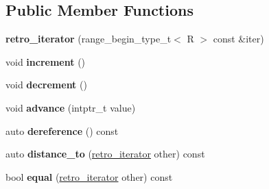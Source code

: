 \subsection*{Public Member Functions}
\begin{DoxyCompactItemize}
\item 
\mbox{\label{struct_r_a_h___n_a_m_e_s_p_a_c_e_1_1view_1_1retro__iterator_adb9205eb961750d70b557e4feb097e90}} 
{\bfseries retro\+\_\+iterator} (range\+\_\+begin\+\_\+type\+\_\+t$<$ R $>$ const \&iter)
\item 
\mbox{\label{struct_r_a_h___n_a_m_e_s_p_a_c_e_1_1view_1_1retro__iterator_a9eb8615dcaec398cc57595dcb7822af2}} 
void {\bfseries increment} ()
\item 
\mbox{\label{struct_r_a_h___n_a_m_e_s_p_a_c_e_1_1view_1_1retro__iterator_acc9b3287cf662c34313077a70594ad95}} 
void {\bfseries decrement} ()
\item 
\mbox{\label{struct_r_a_h___n_a_m_e_s_p_a_c_e_1_1view_1_1retro__iterator_abcb1e1453c7577e8a79ebad3f81ead98}} 
void {\bfseries advance} (intptr\+\_\+t value)
\item 
\mbox{\label{struct_r_a_h___n_a_m_e_s_p_a_c_e_1_1view_1_1retro__iterator_a1e188574ae18f045816f0181224bcc36}} 
auto {\bfseries dereference} () const
\item 
\mbox{\label{struct_r_a_h___n_a_m_e_s_p_a_c_e_1_1view_1_1retro__iterator_a5332cbcf2b00984baeac1c823c163a1c}} 
auto {\bfseries distance\+\_\+to} (\mbox{\hyperlink{struct_r_a_h___n_a_m_e_s_p_a_c_e_1_1view_1_1retro__iterator}{retro\+\_\+iterator}} other) const
\item 
\mbox{\label{struct_r_a_h___n_a_m_e_s_p_a_c_e_1_1view_1_1retro__iterator_aaf1567eb8cf804b198bef2892e024064}} 
bool {\bfseries equal} (\mbox{\hyperlink{struct_r_a_h___n_a_m_e_s_p_a_c_e_1_1view_1_1retro__iterator}{retro\+\_\+iterator}} other) const
\end{DoxyCompactItemize}
